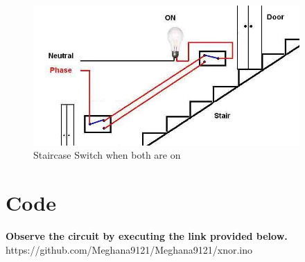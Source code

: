 \documentclass[journal,12pt,twocolumn]{IEEEtran}
\begin{document}
\begin{figure}
    \centering
    \includegraphics[width=4in]{Staircase.jpeg}
    \caption{Staircase Switch when both are on}
    \label{fig:circuit}
\end{figure}


\begin{table}[ht]
\centering
{}
\caption{Truth table}
\label{Truth table}
\end{table}
\section{Code}

\textbf{Observe the circuit by executing the link provided below.}\\

https://github.com/Meghana9121/Meghana9121/xnor.ino
\end{document}
